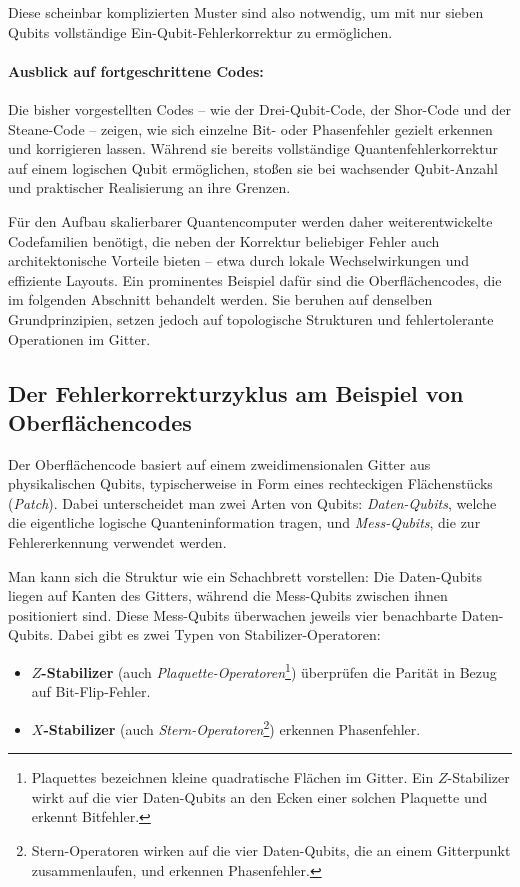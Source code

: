 \noindent
Diese scheinbar komplizierten Muster sind also notwendig, um mit nur sieben Qubits vollständige Ein-Qubit-Fehlerkorrektur zu ermöglichen.
\cite[Seite 12]{devitt_qec_2013}\\

\paragraph{Ausblick auf fortgeschrittene Codes:}

Die bisher vorgestellten Codes – wie der Drei-Qubit-Code, der Shor-Code und der Steane-Code – zeigen, wie sich einzelne Bit- oder Phasenfehler gezielt erkennen und korrigieren lassen. Während sie bereits vollständige Quantenfehlerkorrektur auf einem logischen Qubit ermöglichen, stoßen sie bei wachsender Qubit-Anzahl und praktischer Realisierung an ihre Grenzen.

Für den Aufbau skalierbarer Quantencomputer werden daher weiterentwickelte Codefamilien benötigt, die neben der Korrektur beliebiger Fehler auch architektonische Vorteile bieten – etwa durch lokale Wechselwirkungen und effiziente Layouts. Ein prominentes Beispiel dafür sind die Oberflächencodes, die im folgenden Abschnitt behandelt werden. Sie beruhen auf denselben Grundprinzipien, setzen jedoch auf topologische Strukturen und fehlertolerante Operationen im Gitter.


\subsection{Der Fehlerkorrekturzyklus am Beispiel von Oberflächencodes}\label{chap:QEC3.2}

Der Oberflächencode basiert auf einem zweidimensionalen Gitter aus physikalischen Qubits, typischerweise in Form eines rechteckigen Flächenstücks (\emph{Patch}). Dabei unterscheidet man zwei Arten von Qubits: \emph{Daten-Qubits}, welche die eigentliche logische Quanteninformation tragen, und \emph{Mess-Qubits}, die zur Fehlererkennung verwendet werden.

Man kann sich die Struktur wie ein Schachbrett vorstellen: Die Daten-Qubits liegen auf Kanten des Gitters, während die Mess-Qubits zwischen ihnen positioniert sind. Diese Mess-Qubits überwachen jeweils vier benachbarte Daten-Qubits. Dabei gibt es zwei Typen von Stabilizer-Operatoren:
\begin{itemize}
  \item \textbf{\(Z\)-Stabilizer} (auch \emph{Plaquette-Operatoren}\footnote{Plaquettes bezeichnen kleine quadratische Flächen im Gitter. Ein \(Z\)-Stabilizer wirkt auf die vier Daten-Qubits an den Ecken einer solchen Plaquette und erkennt Bitfehler.}) überprüfen die Parität in Bezug auf Bit-Flip-Fehler.
  \item \textbf{\(X\)-Stabilizer} (auch \emph{Stern-Operatoren}\footnote{Stern-Operatoren wirken auf die vier Daten-Qubits, die an einem Gitterpunkt zusammenlaufen, und erkennen Phasenfehler.}) erkennen Phasenfehler.
\end{itemize}
\cite[677]{google_quantum_ai_suppressing_2023}
\cite[28]{devitt_quantum_2013}


